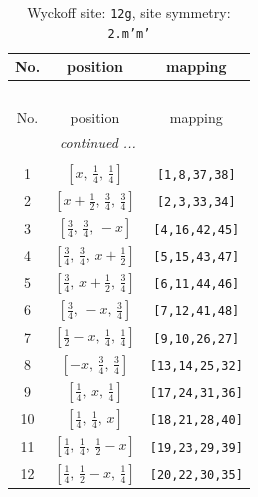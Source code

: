 \documentclass[fleqn,8pt]{jsarticle}
\begin{document}
\begin{longtable}{ccc}
\caption{Wyckoff site: {\tt 12g}, site symmetry: {\tt 2.m'm'}}
 \\
 \hline \hline
No. & position & mapping \\ \hline \endfirsthead

\multicolumn{2}{l}{\tablename\ \thetable{}} \\
 \hline \hline
No. & position & mapping \\ \hline \endhead

 \hline \hline
\multicolumn{2}{r}{\footnotesize\it continued ...} \\ \endfoot

 \hline \hline
\multicolumn{2}{r}{} \\ \endlastfoot

1 & $\left[ x,\, \frac{1}{4},\, \frac{1}{4} \right]$ & {\tt [1,8,37,38]} \\ \hline
2 & $\left[ x + \frac{1}{2},\, \frac{3}{4},\, \frac{3}{4} \right]$ & {\tt [2,3,33,34]} \\ \hline
3 & $\left[ \frac{3}{4},\, \frac{3}{4},\, - x \right]$ & {\tt [4,16,42,45]} \\ \hline
4 & $\left[ \frac{3}{4},\, \frac{3}{4},\, x + \frac{1}{2} \right]$ & {\tt [5,15,43,47]} \\ \hline
5 & $\left[ \frac{3}{4},\, x + \frac{1}{2},\, \frac{3}{4} \right]$ & {\tt [6,11,44,46]} \\ \hline
6 & $\left[ \frac{3}{4},\, - x,\, \frac{3}{4} \right]$ & {\tt [7,12,41,48]} \\ \hline
7 & $\left[ \frac{1}{2} - x,\, \frac{1}{4},\, \frac{1}{4} \right]$ & {\tt [9,10,26,27]} \\ \hline
8 & $\left[ - x,\, \frac{3}{4},\, \frac{3}{4} \right]$ & {\tt [13,14,25,32]} \\ \hline
9 & $\left[ \frac{1}{4},\, x,\, \frac{1}{4} \right]$ & {\tt [17,24,31,36]} \\ \hline
10 & $\left[ \frac{1}{4},\, \frac{1}{4},\, x \right]$ & {\tt [18,21,28,40]} \\ \hline
11 & $\left[ \frac{1}{4},\, \frac{1}{4},\, \frac{1}{2} - x \right]$ & {\tt [19,23,29,39]} \\ \hline
12 & $\left[ \frac{1}{4},\, \frac{1}{2} - x,\, \frac{1}{4} \right]$ & {\tt [20,22,30,35]} \\
\end{longtable}
\renewcommand{\arraystretch}{1.2}
\end{document}
